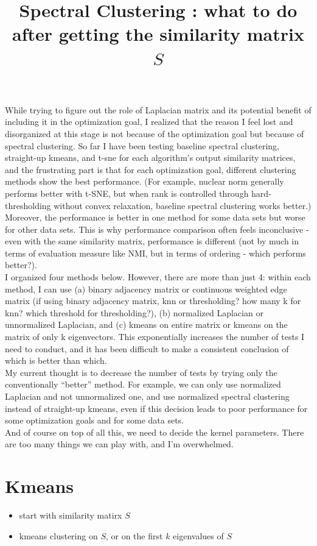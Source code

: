 \documentclass[11pt]{article}
\title{Spectral Clustering : what to do after getting the similarity matrix $S$}
\begin{document}
\noindent While trying to figure out the role of Laplacian matrix and its potential benefit of including it in the optimization goal, I realized that the reason I feel lost and disorganized at this stage is not because of the optimization goal but because of spectral clustering. So far I have been testing baseline spectral clustering, straight-up kmeans, and t-sne for each algorithm's output similarity matrices, and the frustrating part is that for each optimization goal, different clustering methods show the best performance. (For example, nuclear norm generally performs better with t-SNE, but when rank is controlled through hard-thresholding without convex relaxation, baseline spectral clustering works better.) Moreover, the performance is better in one method for some data sets but worse for other data sets. This is why performance comparison often feels inconclusive - even with the same similarity matrix, performance is different (not by much in terms of evaluation measure like NMI, but in terms of ordering - which performs better?).\\

\noindent I organized four methods below. However, there are more than just 4: within each method, I can use (a) binary adjacency matrix or continuous weighted edge matrix (if using binary adjacency matrix, knn or thresholding? how many k for knn? which threshold for thresholding?), (b) normalized Laplacian or unnormalized Laplacian, and (c) kmeans on entire matrix or kmeans on the matrix of only k eigenvectors. This exponentially increases the number of tests I need to conduct, and it has been difficult to make a consistent conclusion of which is better than which.\\

\noindent My current thought is to decrease the number of tests by trying only the conventionally “better” method. For example, we can only use normalized Laplacian and not unnormalized one, and use normalized spectral clustering instead of straight-up kmeans, even if this decision leads to poor performance for some optimization goals and for some data sets.\\

\noindent And of course on top of all this, we need to decide the kernel parameters. There are too many things we can play with, and I'm overwhelmed.


\section*{Kmeans}
\begin{itemize}
\item start with similarity matirx $S$
\item kmeans clustering on $S$, or on the first $k$ eigenvalues of $S$
\end{itemize}
\end{document}

